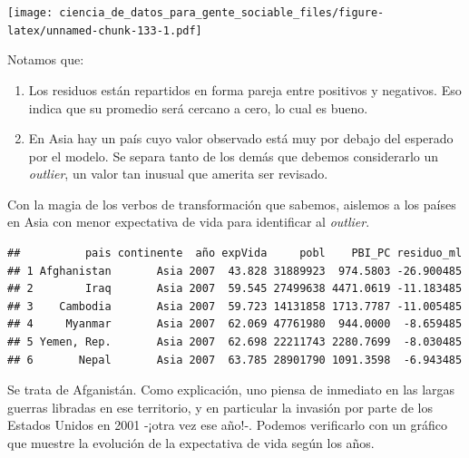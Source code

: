 \documentclass[spanish,]{book}
\newenvironment{Shaded}{\begin{snugshade}}{\end{snugshade}}
\newcommand{\DecValTok}[1]{\textcolor[rgb]{0.00,0.00,0.81}{#1}}
\newcommand{\KeywordTok}[1]{\textcolor[rgb]{0.13,0.29,0.53}{\textbf{#1}}}
\newcommand{\NormalTok}[1]{#1}
\newcommand{\OperatorTok}[1]{\textcolor[rgb]{0.81,0.36,0.00}{\textbf{#1}}}
\newcommand{\StringTok}[1]{\textcolor[rgb]{0.31,0.60,0.02}{#1}}
\providecommand{\tightlist}{%
  \setlength{\itemsep}{0pt}\setlength{\parskip}{0pt}}
\begin{document}
\texttt{[image: ciencia\_de\_datos\_para\_gente\_sociable\_files/figure-latex/unnamed-chunk-133-1.pdf]}

Notamos que:

\begin{enumerate}
\def\labelenumi{\arabic{enumi}.}
\tightlist
\item
  Los residuos están repartidos en forma pareja entre positivos y negativos. Eso indica que su promedio será cercano a cero, lo cual es bueno.
\item
  En Asia hay un país cuyo valor observado está muy por debajo del esperado por el modelo. Se separa tanto de los demás que debemos considerarlo un \emph{outlier}, un valor tan inusual que amerita ser revisado.
\end{enumerate}

Con la magia de los verbos de transformación que sabemos, aislemos a los países en Asia con menor expectativa de vida para identificar al \emph{outlier}.

\begin{Shaded}
\end{Shaded}

\begin{verbatim}
##          pais continente  año expVida     pobl    PBI_PC residuo_ml
## 1 Afghanistan       Asia 2007  43.828 31889923  974.5803 -26.900485
## 2        Iraq       Asia 2007  59.545 27499638 4471.0619 -11.183485
## 3    Cambodia       Asia 2007  59.723 14131858 1713.7787 -11.005485
## 4     Myanmar       Asia 2007  62.069 47761980  944.0000  -8.659485
## 5 Yemen, Rep.       Asia 2007  62.698 22211743 2280.7699  -8.030485
## 6       Nepal       Asia 2007  63.785 28901790 1091.3598  -6.943485
\end{verbatim}

Se trata de Afganistán. Como explicación, uno piensa de inmediato en las largas guerras libradas en ese territorio, y en particular la invasión por parte de los Estados Unidos en 2001 -¡otra vez ese año!-. Podemos verificarlo con un gráfico que muestre la evolución de la expectativa de vida según los años.
\end{document}
